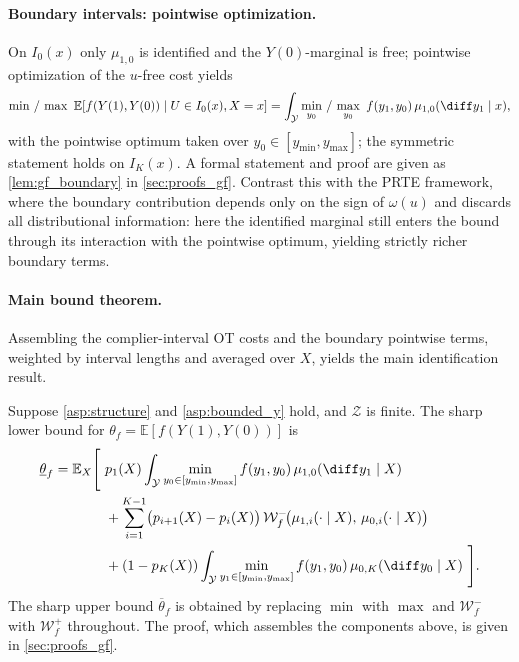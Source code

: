 \paragraph{Boundary intervals: pointwise optimization.} On $I_0(x)$ only $\mu_{1,0}$ is identified and the $Y(0)$-marginal is free; pointwise optimization of the $u$-free cost yields
\[
    \min\, /\, \max\ \mathbb{E}[f(Y(1), Y(0)) \mid U \in I_0(x), X = x] = \int_{\mathcal{Y}} \min_{y_0}\, /\, \max_{y_0}\ f(y_1, y_0)\, \mu_{1,0}(\diff y_1 \mid x),
\]
with the pointwise optimum taken over $y_0 \in [y_{\min}, y_{\max}]$; the symmetric statement holds on $I_K(x)$. A formal statement and proof are given as \cref{lem:gf_boundary} in \cref{sec:proofs_gf}. Contrast this with the PRTE framework, where the boundary contribution depends only on the sign of $\omega(u)$ and discards all distributional information: here the identified marginal still enters the bound through its interaction with the pointwise optimum, yielding strictly richer boundary terms.

\paragraph{Main bound theorem.} Assembling the complier-interval OT costs and the boundary pointwise terms, weighted by interval lengths and averaged over $X$, yields the main identification result.

\begin{theorem}\label{thm:gf_discrete}
    Suppose \cref{asp:structure} and \cref{asp:bounded_y} hold, and $\mathcal{Z}$ is finite. The sharp lower bound for $\theta_f = \mathbb{E}[f(Y(1), Y(0))]$ is
    \begin{equation}\label{eq:gf_discrete_lower}
        \begin{split}
            \underline{\theta}_f = \mathbb{E}_X\Bigg[\ & p_1(X) \int_{\mathcal{Y}} \min_{y_0 \in [y_{\min}, y_{\max}]} f(y_1, y_0)\, \mu_{1,0}(\diff y_1 \mid X) \\
            &+ \sum_{i=1}^{K-1}\bigl(p_{i+1}(X) - p_i(X)\bigr)\, \mathcal{W}_f^-\!\bigl(\mu_{1,i}(\cdot \mid X),\, \mu_{0,i}(\cdot \mid X)\bigr)\\
            &+ (1 - p_K(X)) \int_{\mathcal{Y}} \min_{y_1 \in [y_{\min}, y_{\max}]} f(y_1, y_0)\, \mu_{0,K}(\diff y_0 \mid X)\ \Bigg].
        \end{split}
    \end{equation}
    The sharp upper bound $\overline{\theta}_f$ is obtained by replacing $\min$ with $\max$ and $\mathcal{W}_f^-$ with $\mathcal{W}_f^+$ throughout. The proof, which assembles the components above, is given in \cref{sec:proofs_gf}.
\end{theorem}

